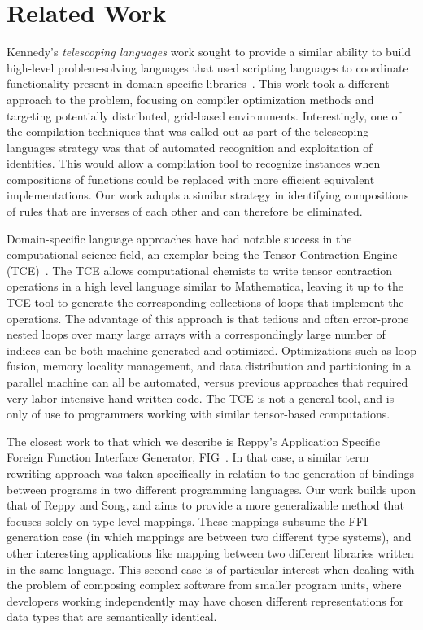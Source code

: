 \section{Related Work}

Kennedy's \emph{telescoping languages} work sought to provide a
similar ability to build high-level problem-solving languages that
used scripting languages to coordinate functionality present in
domain-specific libraries~\cite{kennedy00telescoping}.  This work took
a different approach to the problem, focusing on compiler optimization
methods and targeting potentially distributed, grid-based
environments.  Interestingly, one of the compilation techniques that
was called out as part of the telescoping languages strategy was that
of automated recognition and exploitation of identities.  This would
allow a compilation tool to recognize instances when compositions of
functions could be replaced with more efficient equivalent
implementations.  Our work adopts a similar strategy in identifying
compositions of rules that are inverses of each other and can
therefore be eliminated.

Domain-specific language approaches have had notable success in the
computational science field, an exemplar being the Tensor Contraction
Engine (TCE)~\cite{baumgartner05synthesis}.  The TCE allows
computational chemists to write tensor contraction operations in a
high level language similar to Mathematica, leaving it up to the TCE
tool to generate the corresponding collections of loops that implement
the operations.  The advantage of this approach is that tedious and
often error-prone nested loops over many large arrays with a
correspondingly large number of indices can be both machine generated
and optimized.  Optimizations such as loop fusion, memory locality
management, and data distribution and partitioning in a parallel
machine can all be automated, versus previous approaches that required
very labor intensive hand written code.  The TCE is not a general
tool, and is only of use to programmers working with similar
tensor-based computations.

The closest work to that which we describe is Reppy's Application
Specific Foreign Function Interface Generator, FIG~\cite{reppy06fig}.
In that case, a similar term rewriting approach was taken specifically
in relation to the generation of bindings between programs in two
different programming languages.  Our work builds upon that of Reppy
and Song, and aims to provide a more generalizable method that focuses
solely on type-level mappings.  These mappings subsume the FFI
generation case (in which mappings are between two different type
systems), and other interesting applications like mapping between two
different libraries written in the same language.  This second case is
of particular interest when dealing with the problem of composing
complex software from smaller program units, where developers working
independently may have chosen different representations for data types
that are semantically identical.


